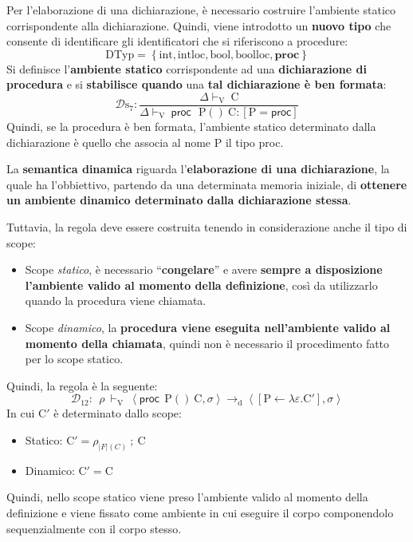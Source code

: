 \documentclass[a4paper]{article}
\newcommand{\dquotes}[1]{``#1''}
\begin{document}
	Per l'elaborazione di una dichiarazione, è necessario costruire l'ambiente statico corrispondente alla dichiarazione. Quindi, viene introdotto un \textbf{nuovo tipo} che consente di identificare gli identificatori che si riferiscono a procedure:
	\begin{equation*}
		\mathrm{DTyp} = \left\{\mathrm{int}, \mathrm{intloc}, \mathrm{bool}, \mathrm{boolloc}, \mathbf{proc}\right\}
	\end{equation*}
	Si definisce l'\textbf{ambiente statico} corrispondente ad una \textbf{dichiarazione di procedura} e si \textbf{stabilisce quando} una \textbf{tal dichiarazione è ben formata}:
	\begin{equation*}
		\mathcal{D}\mathrm{s}_{7} : \dfrac{
			\Delta \vdash_{\mathrm{V}} \: \mathrm{C}
		}{
			\Delta\vdash_{\mathrm{V}} \: \textsf{proc} \:\:\: \mathrm{P()} \: \mathrm{C}:\left[\mathrm{P} = \textsf{proc}\right]
		}
	\end{equation*}
	Quindi, se la procedura è ben formata, l'ambiente statico determinato dalla dichiarazione è quello che associa al nome P il tipo \textsf{proc}.\newline
	
	\noindent
	La \textbf{semantica dinamica} riguarda l'\textbf{elaborazione di una dichiarazione}, la quale ha l'obbiettivo, partendo da una determinata memoria iniziale, di \textbf{ottenere un ambiente dinamico determinato dalla dichiarazione stessa}.
	
	Tuttavia, la regola deve essere costruita tenendo in considerazione anche il tipo di scope:
	\begin{itemize}
		\item Scope \emph{statico}, è necessario \dquotes{\textbf{congelare}} e avere \textbf{sempre a disposizione l'ambiente valido al momento della definizione}, così da utilizzarlo quando la procedura viene chiamata.
		
		\item Scope \emph{dinamico}, la \textbf{procedura viene eseguita nell'ambiente valido al momento della chiamata}, quindi non è necessario il procedimento fatto per lo scope statico.
	\end{itemize}
	Quindi, la regola è la seguente:
	\begin{equation*}
		\mathcal{D}_{12} : \:\: \rho \: \vdash_{\mathrm{V}} \: \left\langle \textsf{proc} \:\: \mathrm{P()} \: \mathrm{C}, \sigma \right\rangle \longrightarrow_{\mathrm{d}} \left\langle \left[\mathrm{P} \leftarrow \lambda \varepsilon . \mathrm{C}'\right], \sigma \right\rangle
	\end{equation*}
	In cui $\mathrm{C}'$ è determinato dallo scope:
	\begin{itemize}
		\item Statico: $\mathrm{C}' = \rho_{|F|\left(C\right)} \: ; \: \mathrm{C}$
		
		\item Dinamico: $\mathrm{C}' = \mathrm{C}$
	\end{itemize}
	Quindi, nello scope statico viene preso l'ambiente valido al momento della definizione e viene fissato come ambiente in cui eseguire il corpo componendolo sequenzialmente con il corpo stesso.\newpage
	
\end{document}
